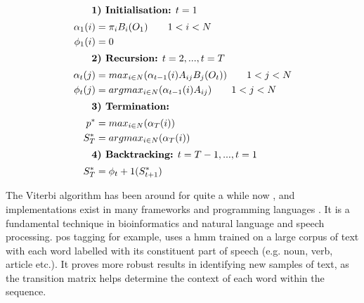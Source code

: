 {{{{{{{\indent
{
\begin{align}
\intertext{ \indent \textbf{1) Initialisation:} $t=1$}
			\alpha_1(i) &= \pi_{i}B_{i}(O_1)\qquad1<i<N \nonumber \\
			\phi_1(i) &= 0 \label{eq:markovstart} \\
\intertext{ \indent \textbf{2) Recursion:} $t=2,...,t=T$}
			\alpha_t(j) &= max_{i\in N}(\alpha_{t-1}(i)A_{ij}B_{j}(O_{t}))\qquad1<j<N \nonumber \\
			\phi_t(j) &= argmax_{i\in N}(\alpha_{t-1}(i)A_{ij})\qquad1<j<N\\
\intertext{ \indent \textbf{3) Termination:}}
			p^* &= max_{i \in N}(\alpha_T(i)) \nonumber \\
			S^*_{T} &= argmax_{i \in N}(\alpha_T(i))\\
\intertext{ \indent \textbf{4) Backtracking:} $t=T-1,...,t=1$}
			S^*_{T} &= \phi_t+1(S^*_{t+1}) \label{eq:markovend}
\end{align}
}

\normalsize

The Viterbi algorithm has been around for quite a while now \citep{Viterbi1967}, and implementations exist in many frameworks and programming languages \citep{Bird2016, Gueguen2005}. It is a fundamental technique in bioinformatics and natural language and speech processing. \acrfull{pos} tagging for example, uses a \acrshort{hmm} trained on a large corpus of text with each word labelled with its constituent part of speech (e.g. noun, verb, article etc.). It proves more robust results in identifying new samples of text, as the transition matrix helps determine the context of each word within the sequence. 


}}}}}}}

